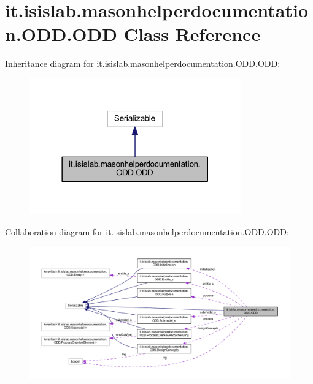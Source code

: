 \hypertarget{classit_1_1isislab_1_1masonhelperdocumentation_1_1_o_d_d_1_1_o_d_d}{\section{it.\-isislab.\-masonhelperdocumentation.\-O\-D\-D.\-O\-D\-D Class Reference}
\label{classit_1_1isislab_1_1masonhelperdocumentation_1_1_o_d_d_1_1_o_d_d}
}


Inheritance diagram for it.\-isislab.\-masonhelperdocumentation.\-O\-D\-D.\-O\-D\-D\-:\nopagebreak
\begin{figure}[H]
\begin{center}
\leavevmode
\includegraphics[width=258pt]{classit_1_1isislab_1_1masonhelperdocumentation_1_1_o_d_d_1_1_o_d_d__inherit__graph}
\end{center}
\end{figure}


Collaboration diagram for it.\-isislab.\-masonhelperdocumentation.\-O\-D\-D.\-O\-D\-D\-:\nopagebreak
\begin{figure}[H]
\begin{center}
\leavevmode
\includegraphics[width=350pt]{classit_1_1isislab_1_1masonhelperdocumentation_1_1_o_d_d_1_1_o_d_d__coll__graph}
\end{center}
\end{figure}
